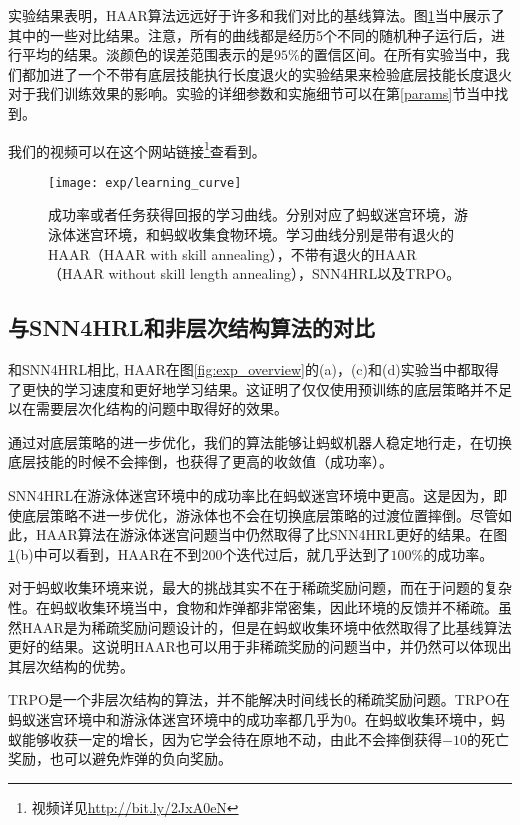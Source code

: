 实验结果表明，HAAR算法远远好于许多和我们对比的基线算法。图\ref{fig:learning_curve}当中展示了其中的一些对比结果。注意，所有的曲线都是经历5个不同的随机种子运行后，进行平均的结果。淡颜色的误差范围表示的是$95\%$的置信区间。在所有实验当中，我们都加进了一个不带有底层技能执行长度退火的实验结果来检验底层技能长度退火对于我们训练效果的影响。实验的详细参数和实施细节可以在第\ref{params}节当中找到。

我们的视频可以在这个网站链接\footnote{视频详见\url{http://bit.ly/2JxA0eN}}查看到。

\begin{figure}[ht]
    \centering
    \texttt{[image: exp/learning\_curve]}
    \caption{成功率或者任务获得回报的学习曲线。分别对应了蚂蚁迷宫环境，游泳体迷宫环境，和蚂蚁收集食物环境。学习曲线分别是带有退火的HAAR（HAAR with skill annealing），不带有退火的HAAR（HAAR without skill length annealing），SNN4HRL以及TRPO。}
    \label{fig:learning_curve}
\end{figure}

\subsection{与SNN4HRL和非层次结构算法的对比}

和SNN4HRL相比, HAAR在图\ref{fig:exp_overview}的(a)，(c)和(d)实验当中都取得了更快的学习速度和更好地学习结果。这证明了仅仅使用预训练的底层策略并不足以在需要层次化结构的问题中取得好的效果。

通过对底层策略的进一步优化，我们的算法能够让蚂蚁机器人稳定地行走，在切换底层技能的时候不会摔倒，也获得了更高的收敛值（成功率）。

SNN4HRL在游泳体迷宫环境中的成功率比在蚂蚁迷宫环境中更高。这是因为，即使底层策略不进一步优化，游泳体也不会在切换底层策略的过渡位置摔倒。尽管如此，HAAR算法在游泳体迷宫问题当中仍然取得了比SNN4HRL更好的结果。在图\ref{fig:learning_curve}(b)中可以看到，HAAR在不到200个迭代过后，就几乎达到了$100\%$的成功率。

对于蚂蚁收集环境来说，最大的挑战其实不在于稀疏奖励问题，而在于问题的复杂性。在蚂蚁收集环境当中，食物和炸弹都非常密集，因此环境的反馈并不稀疏。虽然HAAR是为稀疏奖励问题设计的，但是在蚂蚁收集环境中依然取得了比基线算法更好的结果。这说明HAAR也可以用于非稀疏奖励的问题当中，并仍然可以体现出其层次结构的优势。

TRPO是一个非层次结构的算法，并不能解决时间线长的稀疏奖励问题。TRPO在蚂蚁迷宫环境中和游泳体迷宫环境中的成功率都几乎为0。在蚂蚁收集环境中，蚂蚁能够收获一定的增长，因为它学会待在原地不动，由此不会摔倒获得$-10$的死亡奖励，也可以避免炸弹的负向奖励。

